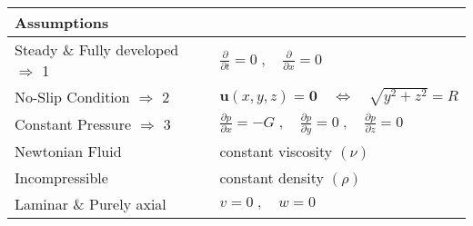 \documentclass[../main.tex]{subfiles}
\begin{document}
	\begin{tabular}{ |l| p{}| }
		\hline
		\multicolumn{2}{|l|}{\textbf{Assumptions}} \\
		\hline		
		Steady  \& Fully developed $\Rightarrow$ 1 & $\frac{\partial}{\partial t} = 0 \; , \quad \frac{\partial}{\partial x} = 0$ \\ 
		No-Slip Condition $\Rightarrow$ 2 & $\mathbf{u}(x,y,z) = \mathbf{0} \quad  \iff \quad \sqrt{y^2+z^2} = R$\\
		Constant Pressure $\Rightarrow$ 3 & $\frac{\partial p}{\partial x} = -G \; , \quad \frac{\partial p}{\partial y} = 0 \; , \quad \frac{\partial p}{\partial z} = 0$\\
		\hline
		Newtonian Fluid & constant viscosity $(\nu)$\\
		Incompressible & constant density $(\rho)$ \\
		Laminar \& Purely axial & $v = 0 \; , \quad w = 0$ \\
		\hline
	\end{tabular}
\end{document}
